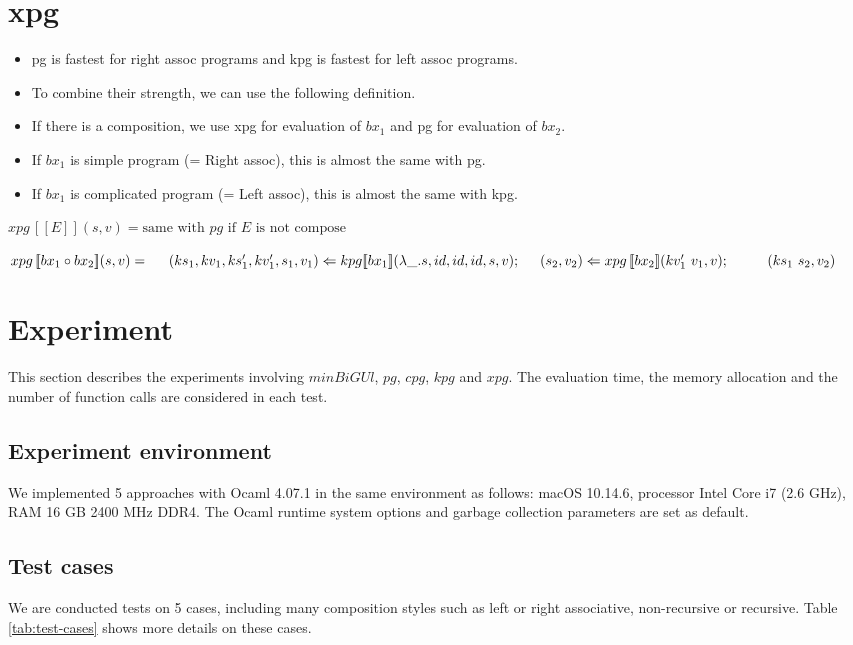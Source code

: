 \documentclass[runningheads]{llncs}
\newcommand{\tab}{\hspace*{5mm}}
\newcommand{\qtab}{\hspace*{5mm} \ \quad}
\newcommand{\kpg}[7]{kpg [\![#1]\!] (#2, #3, #4, #5, #6, #7)}
\newcommand{\xpg}[3]{xpg \, [\![#1]\!] (#2, #3)}
\begin{document}
\section{xpg}

\begin{itemize}
\item pg is fastest for right assoc programs and kpg is fastest for left assoc programs.
\item To combine their strength, we can use the following definition.
\item If there is a composition, we use xpg for evaluation of $bx_1$ and pg for evaluation of $bx_2$.
\item If $bx_1$ is simple program (= Right assoc), this is almost the same with pg.
\item If $bx_1$ is complicated program (= Left assoc), this is almost the same with kpg.
\end{itemize}

$\xpg{E}{s}{v} = \text{same with } pg \text{ if } E \text{ is not compose}$

$\xpg{bx_1 \circ bx_2}{s}{v} =\\
    \tab (ks_1,kv_1, ks_1', kv_1', s_1, v_1) \Leftarrow \kpg{bx_1}{\lambda \_.s}{id}{id}{id}{s}{v};\\
    \tab (s_2, v_2) \Leftarrow \xpg{bx_2}{kv_1' \ v_1}{v};\\
    \qtab (ks_1 \ s_2, v_2)$

\section{Experiment}

This section describes the experiments involving $minBiGUl$, $pg$, $cpg$, $kpg$ and $xpg$. The evaluation time, the memory allocation and the number of function calls are considered in each test.

\subsection{Experiment environment}
We implemented 5 approaches with Ocaml 4.07.1 in the same environment as follows: macOS 10.14.6, processor Intel Core i7 (2.6 GHz), RAM 16 GB 2400 MHz DDR4. The Ocaml runtime system options and garbage collection parameters are set as default.  

\subsection{Test cases}
We are conducted tests on 5 cases, including many composition styles such as left or right associative, non-recursive or recursive. Table \ref{tab:test-cases} shows more details on these cases.
\end{document}

